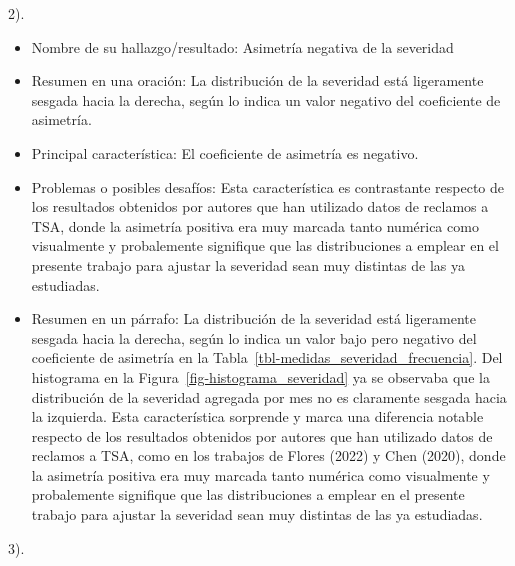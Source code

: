 \documentclass[
  letterpaper,
  onepage,
  openany]{scrreprt}
\begin{document}
2).

\begin{itemize}
\item
  Nombre de su hallazgo/resultado: Asimetría negativa de la severidad
\item
  Resumen en una oración: La distribución de la severidad está
  ligeramente sesgada hacia la derecha, según lo indica un valor
  negativo del coeficiente de asimetría.
\item
  Principal característica: El coeficiente de asimetría es negativo.
\item
  Problemas o posibles desafíos: Esta característica es contrastante
  respecto de los resultados obtenidos por autores que han utilizado
  datos de reclamos a TSA, donde la asimetría positiva era muy marcada
  tanto numérica como visualmente y probalemente signifique que las
  distribuciones a emplear en el presente trabajo para ajustar la
  severidad sean muy distintas de las ya estudiadas.
\item
  Resumen en un párrafo: La distribución de la severidad está
  ligeramente sesgada hacia la derecha, según lo indica un valor bajo
  pero negativo del coeficiente de asimetría en la
  Tabla~\ref{tbl-medidas_severidad_frecuencia}. Del histograma en la
  Figura~\ref{fig-histograma_severidad} ya se observaba que la
  distribución de la severidad agregada por mes no es claramente sesgada
  hacia la izquierda. Esta característica sorprende y marca una
  diferencia notable respecto de los resultados obtenidos por autores
  que han utilizado datos de reclamos a TSA, como en los trabajos de
  Flores (2022) y Chen (2020), donde la asimetría positiva era muy
  marcada tanto numérica como visualmente y probalemente signifique que
  las distribuciones a emplear en el presente trabajo para ajustar la
  severidad sean muy distintas de las ya estudiadas.
\end{itemize}

3).
\end{document}
